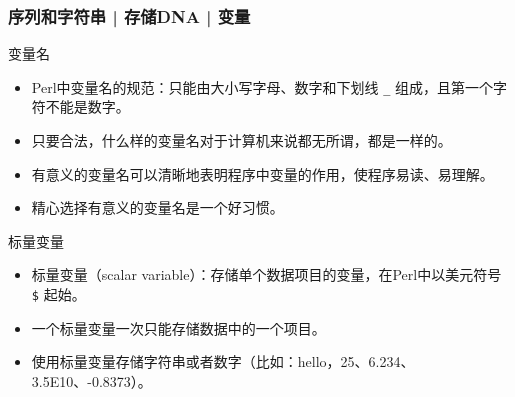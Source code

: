\begin{frame}[fragile]
  \frametitle{序列和字符串 | 存储DNA | \alert{变量}}
  \begin{block}{变量名}
  \begin{itemize}
    \item Perl中变量名的规范：只能由大小写字母、数字和下划线 \verb|_| 组成，且第一个字符不能是数字。
    \item 只要合法，什么样的变量名对于计算机来说都无所谓，都是一样的。
    \item 有意义的变量名可以清晰地表明程序中变量的作用，使程序易读、易理解。
    \item 精心选择有意义的变量名是一个好习惯。
  \end{itemize}
  \end{block}
  \pause
  \begin{block}{标量变量}
    \begin{itemize}
      \item 标量变量（scalar variable）：存储单个数据项目的变量，在Perl中以美元符号 \verb|$| 起始。
      \item 一个标量变量一次只能存储数据中的一个项目。
      \item 使用标量变量存储字符串或者数字（比如：hello，25、6.234、3.5E10、-0.8373）。
    \end{itemize}
  \end{block}
\end{frame}

